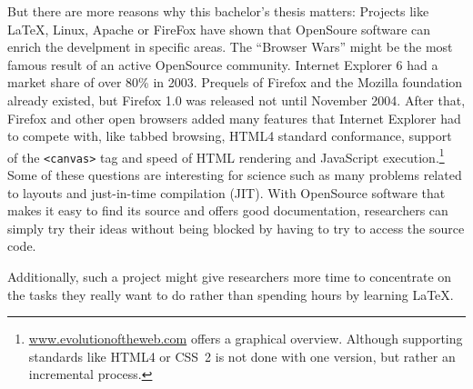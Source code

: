 \documentclass[a4paper]{scrartcl}
\begin{document}
But there are more reasons why this bachelor's thesis matters:
Projects like \LaTeX{}, Linux, Apache or FireFox have shown that
OpenSoure software can enrich the develpment in specific areas. The
\enquote{Browser Wars} might be the most famous result of an active
OpenSource community. Internet Explorer 6 had
a market share of over 80\% in 2003. Prequels of Firefox and the Mozilla 
foundation already existed, but Firefox 1.0 was released not until
November 2004. After that, Firefox and other open browsers added many
features that Internet Explorer had to compete with, like tabbed browsing,
HTML4 standard conformance, support of the \texttt{<canvas>} tag and
speed of HTML rendering and JavaScript execution.\footnote{\href{http://www.evolutionoftheweb.com/}{www.evolutionoftheweb.com} offers a graphical overview. Although supporting standards like HTML4 or CSS~2 is not done with one version, but rather an incremental process.} Some of these
questions are interesting for science such as many problems related
to layouts and just-in-time compilation (JIT). With OpenSource software
that makes it easy to find its source and offers good documentation,
researchers can simply try their ideas without being blocked by 
having to try to access the source code.

Additionally, such a project might give researchers more time to
concentrate on the tasks they really want to do rather than spending
hours by learning \LaTeX{}.
\end{document}
